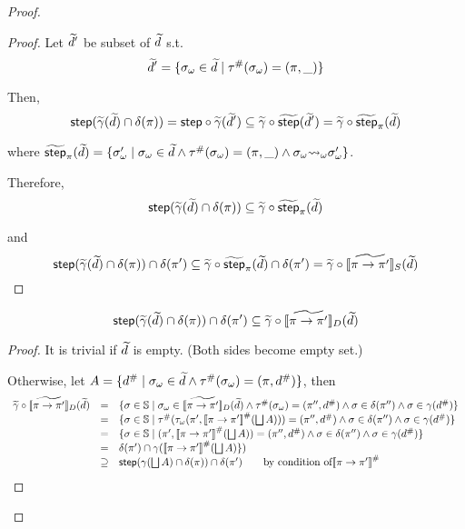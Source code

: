 \begin{proof}
\begin{proof}
\bigskip

Let $\widetilde{d}'$ be subset of $\widetilde{d}$ s.t.
\[
  \widetilde{d}' = \{
      {\sigma}_\omega \in \widetilde{d} \mid
      {\tau}^{\#}({\sigma}_\omega) = (\pi, \_)
    \}
\]

Then,
\[
  \textsf{step} (\widetilde{\gamma} (\widetilde{d}) \cap \delta(\pi)) =
  \textsf{step} \circ \widetilde{\gamma} (\widetilde{d}') \subseteq
  \widetilde{\gamma} \circ \widetilde{\textsf{step}}(\widetilde{d}') =
  \widetilde{\gamma} \circ \widetilde{\textsf{step}}_\pi(\widetilde{d})
\]

where $\widetilde{\textsf{step}}_\pi(\widetilde{d}) = \{
      {\sigma}_\omega' \mid {\sigma}_\omega \in \widetilde{d} \wedge
      {\tau}^{\#}({\sigma}_\omega) = (\pi, \_) \wedge
      {\sigma}_\omega {\leadsto}_\omega {\sigma}_\omega'
    \}$.

\bigskip

Therefore,
\[
  \textsf{step} (\widetilde{\gamma} (\widetilde{d}) \cap \delta(\pi)) \subseteq
  \widetilde{\gamma} \circ \widetilde{\textsf{step}}_\pi(\widetilde{d})
\]

and
\[
  \textsf{step} (\widetilde{\gamma} (\widetilde{d}) \cap \delta(\pi)) \cap \delta(\pi') \subseteq
  \widetilde{\gamma} \circ \widetilde{\textsf{step}}_\pi(\widetilde{d}) \cap \delta(\pi') =
  \widetilde{\gamma} \circ [\![{\widetilde{\pi \rightarrow \pi'}}]\!]_S(\widetilde{d})
\]
\end{proof}

\begin{lemma}
\[
  \textsf{step}(\widetilde{\gamma}(\widetilde{d}) \cap \delta(\pi))
  \cap \delta(\pi') \subseteq \widetilde{\gamma} \circ
  [\![{\widetilde{\pi \rightarrow \pi'}}]\!]_D(\widetilde{d})
\]
\end{lemma}

\begin{proof}
It is trivial if $\widetilde{d}$ is empty. (Both sides become empty set.)

Otherwise,
let $A = \{ {d}^{\#} \mid {\sigma}_\omega \in \widetilde{d} \wedge {\tau}^{\#}({\sigma}_\omega) = (\pi, {d}^{\#}) \}$,
then
\[
  \begin{array}{rcl}
    \combgamma \circ \combviewtrans{\view}{\view'}_D(\combelem)
    &=& \{
        \st \in \stset \mid
        \symbst \in \combviewtrans{\view}{\view'}_D(\combelem) \wedge
        \saconverter(\symbst) = (\view'', \abselem) \wedge
        \st \in \delta(\view'') \wedge
        \st \in \gamma(\abselem)
        \}\\
    &=& \{
        \st \in \stset \mid
        \saconverter( \asconverter(\view', \viewtrans{\view}{\view'}(\bigjoin A))) = (\view'', \abselem) \wedge
        \st \in \delta(\view'') \wedge
        \st \in \gamma(\abselem)
        \}\\
    &=& \{
        \st \in \stset \mid
        (\view', \viewtrans{\view}{\view'}(\bigjoin A)) = (\view'', \abselem) \wedge
        \st \in \delta(\view'') \wedge
        \st \in \gamma(\abselem)
        \}\\
    &=& \viewmap(\view') \cap \gamma(\viewtrans{\view}{\view'}(\bigjoin A) \})\\
    &\supseteq& \step(\gamma(\bigjoin A )
      \cap \viewmap(\view)) \cap \viewmap(\view') \qquad \text{by condition of} \viewtrans{\view}{\view'} \\
 \end{array}
\]


\end{proof}
\end{proof}
